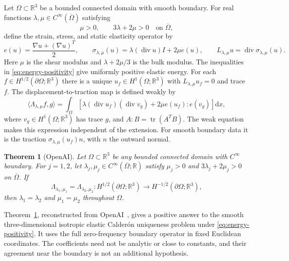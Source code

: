 \documentclass[11pt]{article}
\newcommand{\R}{\mathbb R}
\newcommand{\dd}{\mathrm d}
\DeclareMathOperator{\tr}{tr}
\DeclareMathOperator{\diverg}{div}
\newtheorem{theorem}{Theorem}[section]
\theoremstyle{remark}
\numberwithin{equation}{section}
\begin{document}
Let $\Omega\subset\R^3$ be a bounded connected domain with smooth boundary.
For real functions $\lambda,\mu\in C^\infty(\overline\Omega)$ satisfying
\begin{equation}\label{eq:energy-positivity}
  \mu>0,\qquad 3\lambda+2\mu>0
  \quad\text{on }\overline\Omega,
\end{equation}
define the strain, stress, and static elasticity operator by
\begin{equation}\label{eq:physical-operator}
 e(u)=\frac{\nabla u+(\nabla u)^T}{2},\qquad
 \sigma_{\lambda,\mu}(u)=\lambda(\diverg u)I+2\mu e(u),\qquad
 L_{\lambda,\mu}u=\diverg\sigma_{\lambda,\mu}(u).
\end{equation}
Here $\mu$ is the shear modulus and $\lambda+2\mu/3$ is the bulk modulus.
The inequalities in \eqref{eq:energy-positivity} give uniformly positive
elastic energy. For each $f\in H^{1/2}(\partial\Omega;\R^3)$ there is a
unique $u_f\in H^1(\Omega;\R^3)$ with $L_{\lambda,\mu}u_f=0$ and trace $f$.
The displacement-to-traction map is defined weakly by
\begin{equation}\label{eq:physical-dn}
 \langle\Lambda_{\lambda,\mu}f,g\rangle
 =\int_\Omega\left[
 \lambda(\diverg u_f)(\diverg v_g)+2\mu e(u_f):e(v_g)
 \right]\dd x,
\end{equation}
where $v_g\in H^1(\Omega;\R^3)$ has trace $g$, and $A:B=\tr(A^TB)$.
The weak equation makes this expression independent of the extension.
For smooth boundary data it is the traction
$\sigma_{\lambda,\mu}(u_f)n$, with $n$ the outward normal.

\begin{theorem}[OpenAI]\label{thm:main}
Let $\Omega\subset\R^3$ be any bounded connected domain with
$C^\infty$ boundary. For $j=1,2$, let
$\lambda_j,\mu_j\in C^\infty(\overline\Omega;\R)$ satisfy
$\mu_j>0$ and $3\lambda_j+2\mu_j>0$ on $\overline\Omega$.
If
\[
 \Lambda_{\lambda_1,\mu_1}
 =\Lambda_{\lambda_2,\mu_2}
 \colon H^{1/2}(\partial\Omega;\R^3)
       \longrightarrow H^{-1/2}(\partial\Omega;\R^3),
\]
then $\lambda_1=\lambda_2$ and $\mu_1=\mu_2$ throughout $\Omega$.
\end{theorem}

Theorem~\ref{thm:main}, reconstructed from OpenAI~\cite{OpenAI2026}, gives a positive answer to the smooth
three-dimensional isotropic elastic Calder\'on uniqueness problem under
\eqref{eq:energy-positivity}. It uses the full zero-frequency boundary
operator in fixed Euclidean coordinates. The coefficients need not be
analytic or close to constants, and their agreement near the boundary is
not an additional hypothesis.
\end{document}
